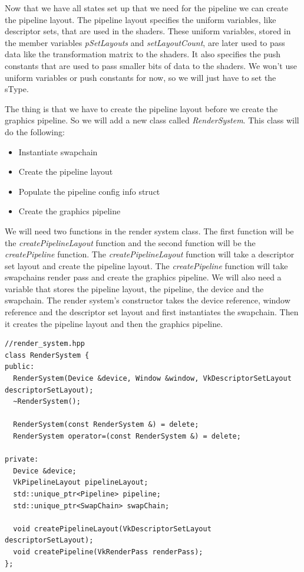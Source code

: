 \documentclass[12pt]{report} \usepackage{preamble}
\begin{document}
Now that we have all states set up that we need for the pipeline we can create the pipeline layout. The pipeline layout
specifies the uniform variables, like descriptor sets, that are used in the shaders. These uniform variables, stored in the member variables
\textit{pSetLayouts} and \textit{setLayoutCount}, are later used to pass data like the
transformation matrix to the shaders. It also specifies the push constants that are used to pass smaller bits of data to the
shaders. We won't use uniform variables or push constants for now, so we will just have to set the sType.

The thing is that we have to create the pipeline layout before we create the graphics pipeline. So we will
add a new class called \textit{RenderSystem}. This class will do the following:

\begin{itemize}
	\item Instantiate swapchain
	\item Create the pipeline layout
	\item Populate the pipeline config info struct
	\item Create the graphics pipeline
\end{itemize}

We will need two functions in the render system class. The first function will be the \textit{createPipelineLayout} function
and the second function will be the \textit{createPipeline} function. The \textit{createPipelineLayout} function will take
a descriptor set layout and create the pipeline layout. The \textit{createPipeline} function will take swapchains render pass and
create the graphics pipeline. We will also need a variable that stores the pipeline
layout, the pipeline, the device and the swapchain. The render system's constructor takes the device reference, window reference and
the descriptor set layout and first instantiates the swapchain. Then it creates the pipeline layout and then the graphics pipeline.

\begin{lstlisting}[Language=C++]
//render_system.hpp
class RenderSystem {
public:
  RenderSystem(Device &device, Window &window, VkDescriptorSetLayout descriptorSetLayout);
  ~RenderSystem();

  RenderSystem(const RenderSystem &) = delete;
  RenderSystem operator=(const RenderSystem &) = delete;

private:
  Device &device;
  VkPipelineLayout pipelineLayout;
  std::unique_ptr<Pipeline> pipeline;
  std::unique_ptr<SwapChain> swapChain;

  void createPipelineLayout(VkDescriptorSetLayout descriptorSetLayout);
  void createPipeline(VkRenderPass renderPass);
};
\end{lstlisting}
\end{document}
